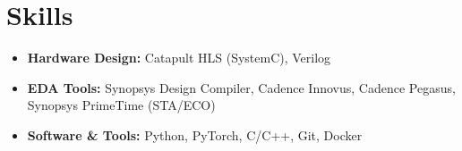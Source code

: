 \documentclass{cvclass}
\begin{document}

\section{Skills}
\begin{itemize}
    \item \textbf{Hardware Design:} Catapult HLS (SystemC), Verilog
    \item \textbf{EDA Tools:} Synopsys Design Compiler, Cadence Innovus, Cadence Pegasus, Synopsys PrimeTime (STA/ECO)
    \item \textbf{Software \& Tools:} Python, PyTorch, C/C++, Git, Docker
\end{itemize}
\end{document}

